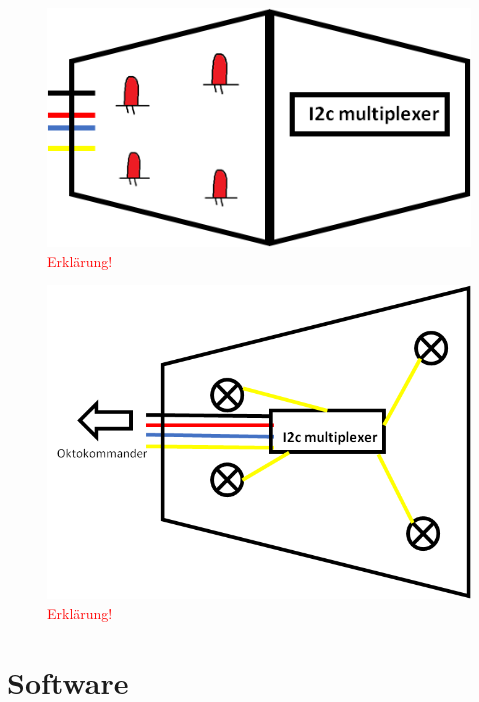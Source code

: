 \begin{figure}[h]
	\centering
	\includegraphics[scale=0.7]{../figures/DetektormodulOffen.png}
	\caption{\textcolor{red}{Erklärung!}}
	\label{fig:DetektormodulOffen}
\end{figure}

\begin{figure}[h]
	\centering
	\includegraphics[scale=0.5]{../figures/PrinzipskizzeDetektormodul.png}
	\caption{\textcolor{red}{Erklärung!}}
	\label{fig:PrinzipskizzeDetektormodul}
\end{figure}


\section{Software}
\label{sec:Software}

